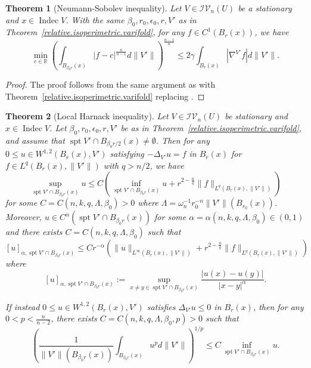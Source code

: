 \documentclass[11pt]{amsart}
\newtheorem{theorem}{Theorem}[section]
\theoremstyle{definition}
\newcommand{\R}{\mathbb{R}}
\newcommand{\IV}{\mathcal{IV}}
\DeclareMathOperator{\spt}{spt}
\DeclareMathOperator{\indec}{Indec}
\begin{document}
\begin{theorem}[Neumann-Sobolev inequality]\label{Neumann.sobolev.inequality}
    Let $V\in \IV_n(U)$ be a stationary and $x\in\indec V$. With the same $\beta_0,r_0,\epsilon_0,r,V'$ as in Theorem~\ref{relative.isoperimetric.varifold}, for any $f\in C^1(B_{r}(x))$, we have
    \[\min_{c\in \R}(\int _{B_{\beta_0 r}(x)}|f-c|^{\frac{n}{n-1}}d\|V'\|)^{\frac{n-1}{n}}\le 2\gamma \int_{B_{r}(x)}|\nabla^{V'} f|d\|V'\|.\]
\end{theorem}
\begin{proof}
    The proof follows from the same argument as \cite[Theorem 3]{bombieri1972harnack} with Theorem~\ref{relative.isoperimetric.varifold} replacing \cite[Theorem 2]{bombieri1972harnack}.
\end{proof}
\begin{theorem}[Local Harnack inequality]\label{LocalHarnack.balls}
	Let $V\in \IV_n(U)$ be stationary and $x\in \indec V$. Let $\beta_0,r_0,\epsilon_0,r,V'$ be as in Theorem~\ref{relative.isoperimetric.varifold}, and assume that $\spt V'\cap B_{\beta_0 r/2}(x)\neq\emptyset$. Then for any $0\le u\in W^{1,2}(B_{r}(x),V')$ satisfying $-\Delta_{V'}u=f$ in $B_{r}(x)$ for $f\in L^{q}(B_r(x),\|V'\|)$ with $q>n/2$, we have 
    \begin{equation}\label{harnack}
        \sup_{\spt V'\cap B_{\beta_0 r}(x)}u\le C(\inf_{\spt V'\cap B_{\beta_0 r}(x)} u+r^{2-\frac{n}{q}}\|f\|_{L^{q}(B_r(x),\|V'\|)})
    \end{equation}
    for some $C=C(n,k,q,\Lambda,\beta_0)>0$ where $\Lambda=\omega_n^{-1}r_0^{-n}\|V'\|(B_{r_0}(x))$.
	Moreover, $u\in C^\alpha(\spt V'\cap B_{\beta_0 r}(x))$ for some $\alpha=\alpha(n,k,q,\Lambda,\beta_0)\in (0,1)$ and  there exists $C=C(n,k,q,\Lambda,\beta_0)$ such that
	\[[u]_{\alpha,\spt V'\cap B_{\beta_0 r}(x)}\le Cr^{-\alpha}(\|u\|_{L^\infty(B_r(x),\|V'\|)}+r^{2-\frac{n}{q}}\|f\|_{L^{q}(B_r(x),\|V'\|)})\]
	where \[[u]_{\alpha,\spt V'\cap B_{\beta_0 r}(x)}:=\sup_{x\neq y\in \spt V'\cap B_{\beta_0 r}(x)}\frac{|u(x)-u(y)|}{|x-y|^\alpha}.\]
	
	If instead $0\le u\in W^{1,2} ( B_r(x),V')$ satisfies $\Delta_{V'} u\le0$ in $B_r(x)$, then for any $0<p<\frac{n}{n-2}$, there exists $C=C(n,k,q,\Lambda,\beta_0,p)>0$ such that 
	\[(\frac{1}{\|V'\|(B_{\beta_0 r}(x))}\int_{B_{\beta_0 r}(x)} u^pd\|V'\|)^{1/p}\le C\inf_{\spt V'\cap B_{\beta_0 r}(x)} u.\]
\end{theorem}
\end{document}
